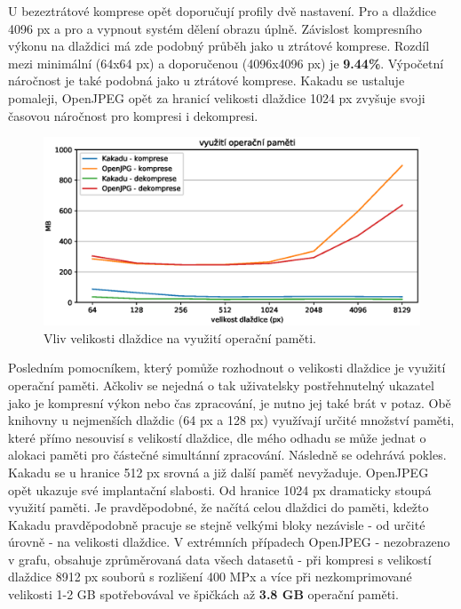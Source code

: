 \clearpage
\noindent U bezeztrátové komprese opět doporučují profily dvě nastavení. Pro  a  dlaždice 4096 px a pro  a  vypnout systém dělení obrazu úplně. Závislost kompresního výkonu na dlaždici má zde podobný průběh jako u ztrátové komprese. Rozdíl mezi minimální (64x64 px) a doporučenou (4096x4096 px) je \textbf{9.44\%}. Výpočetní náročnost je také podobná jako u ztrátové komprese. Kakadu se ustaluje pomaleji, OpenJPEG opět za hranicí velikosti dlaždice 1024 px zvyšuje svoji časovou náročnost pro kompresi i dekompresi.

\begin{figure}[hbt!]
  \centering
  \hspace*{-0.75cm}
  \includegraphics[width=16cm]{obrazky-figures/ram.eps}
  \caption{Vliv velikosti dlaždice na využití operační paměti.}
\end{figure}
\noindent Posledním pomocníkem, který pomůže rozhodnout o velikosti dlaždice je využití operační paměti. Ačkoliv se nejedná o tak uživatelsky postřehnutelný ukazatel jako je kompresní výkon nebo čas zpracování, je nutno jej také brát v potaz.
Obě knihovny u nejmenších dlaždic (64 px a 128 px) využívají určité množství paměti, které přímo nesouvisí s velikostí dlaždice, dle mého odhadu se může jednat o alokaci paměti pro částečné simultánní zpracování. Následně se odehrává pokles. Kakadu se u hranice 512 px srovná a již další paměť nevyžaduje. OpenJPEG opět ukazuje své implantační slabosti. Od hranice 1024 px dramaticky stoupá využití paměti. Je pravděpodobné, že načítá celou dlaždici do paměti, kdežto Kakadu pravděpodobně pracuje se stejně velkými bloky nezávisle - od určité úrovně - na velikosti dlaždice. V extrémních případech OpenJPEG - nezobrazeno v grafu, obsahuje zprůměrovaná data všech datasetů - při kompresi s velikostí dlaždice 8912 px souborů s rozlišení 400 MPx a více při nezkomprimované velikosti 1-2 GB spotřebovával ve špičkách až \textbf{3.8 GB} operační paměti.\\
